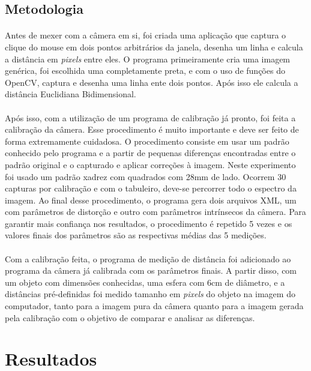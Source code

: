 \documentclass{article}
\begin{document}
		\subsection{Metodologia}
			\paragraph{}
			Antes de mexer com a câmera em si, foi criada uma aplicação que captura o clique do mouse em dois pontos arbitrários da janela, desenha um linha e calcula a distância em \textit{pixels} entre eles. O programa primeiramente cria uma imagem genérica, foi escolhida uma completamente preta, e com o uso de funções do OpenCV, captura e desenha uma linha ente dois pontos. Após isso ele calcula a distância Euclidiana Bidimensional.
			\paragraph{}
			Após isso, com a utilização de um programa de calibração já pronto, foi feita a calibração da câmera. Esse procedimento é muito importante e deve ser feito de forma extremamente cuidadosa. O procedimento consiste em usar um padrão conhecido pelo programa e a partir de pequenas diferenças encontradas entre o padrão original e o capturado e aplicar correções à imagem. Neste experimento foi usado um padrão xadrez com quadrados com 28mm de lado. Ocorrem 30 capturas por calibração e com o tabuleiro, deve-se percorrer todo o espectro da imagem. Ao final desse procedimento, o programa gera dois arquivos XML, um com parâmetros de distorção e outro com parâmetros intrínsecos da câmera. Para garantir mais confiança nos resultados, o procedimento é repetido 5 vezes e os valores finais dos parâmetros são as respectivas médias das 5 medições.
			\paragraph{}
			Com a calibração feita, o programa de medição de distância foi adicionado ao programa da câmera já calibrada com os parâmetros finais. A partir disso, com um objeto com dimensões conhecidas, uma esfera com 6cm de diâmetro, e a distâncias pré-definidas foi medido tamanho em \textit{pixels} do objeto na imagem do computador, tanto para a imagem pura da câmera quanto para a imagem gerada pela calibração com o objetivo de comparar e analisar as diferenças.
		\section{Resultados}
\end{document}
